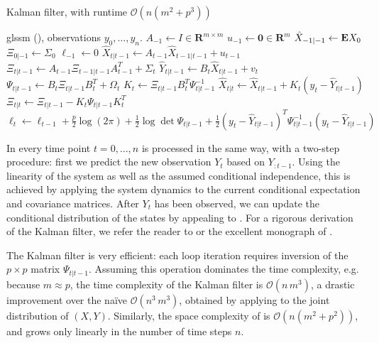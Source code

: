 \begin{algorithm}
    \caption{Kalman filter, with runtime $\mathcal O(n(m^{2} + p^{3}))$}
    \label{alg:kalman_filter}
    \begin{algorithmic}
        \Require \gls{glssm} (), observations $y_{0}, \dots, y_{n}$.
        \State $A_{-1} \gets I \in \mathbf R^{m\times m}$ 
        \State $u_{-1} \gets \mathbf 0 \in \mathbf R^{m}$ 
        \State $\hat X_{-1|-1} \gets \mathbf E X_0$
        \State $\Xi_{0|-1} \gets \Sigma_{0}$
        \State $\ell_{-1} \gets 0$
            \State $\hat X_{t| t - 1} \gets A_{t-1} \hat X_{t-1|t-1} + u_{t-1}$ 
            \State $\Xi_{t | t - 1} \gets A_{t - 1} \Xi_{t - 1 | t - 1 } A_{t - 1}^{T} + \Sigma_{t}$ 
            \State $\hat Y_{t|t - 1} \gets B_{t}\hat X_{t | t - 1} + v_{t}$
            \State $\Psi_{t|t - 1} \gets B_{t}\Xi_{t | t - 1} B_{t}^T + \Omega_{t}$
            \State $K_t \gets \Xi_{t | t - 1} B_{t}^T \Psi_{t | t - 1} ^{-1}$ 
            \State $\hat X_{t | t} \gets \hat X_{t | t - 1} + K_t (y_{t} - \hat Y_{t | t - 1})$
            \State $\Xi_{t| t } \gets \Xi_{t | t - 1} - K_t \Psi_{t| t - 1} K_t^T$
            \State $\ell_{t} \gets \ell_{t - 1} + \frac{p}{2} \log (2\pi) + \frac{1}{2}\log\det \Psi_{t|t -1} + \frac{1}{2} \left( y_{t} - \hat Y_{t | t - 1} \right)^{T} \Psi_{t|t-1}^{-1} \left( y_{t} - \hat Y_{t | t - 1} \right) $ 
        \EndFor
    \end{algorithmic}
\end{algorithm}
In  every time point $t = 0, \dots, n$ is processed in the same way, with a two-step procedure: first we predict the new observation $Y_{t}$ based on $Y_{:t-1}$. Using the linearity of the system as well as the assumed conditional independence, this is achieved by applying the system dynamics to the current conditional expectation and covariance matrices. After $Y_{t}$ has been observed, we can update the conditional distribution of the states by appealing to . 
For a rigorous derivation of the Kalman filter, we refer the reader to \citep[Chapter 4]{Durbin2012Time} or the excellent monograph of \citep{Schneider1986Kalmanfilter}. 

The Kalman filter is very efficient: each loop iteration requires inversion of the $p \times p$ matrix $\Psi_{t | t - 1}$. Assuming this operation dominates the time complexity, e.g. because $m \approx p$, the time complexity of the Kalman filter is $\mathcal O(n\,m^{3})$, a drastic improvement over the naïve $\mathcal O(n^{3}\,m^{3})$, obtained by applying  to the joint distribution of $(X,Y)$. Similarly, the space complexity of  is $\mathcal O \left( n \left( m^{2} + p^{2} \right) \right)$, and grows only linearly in the number of time steps $n$.


